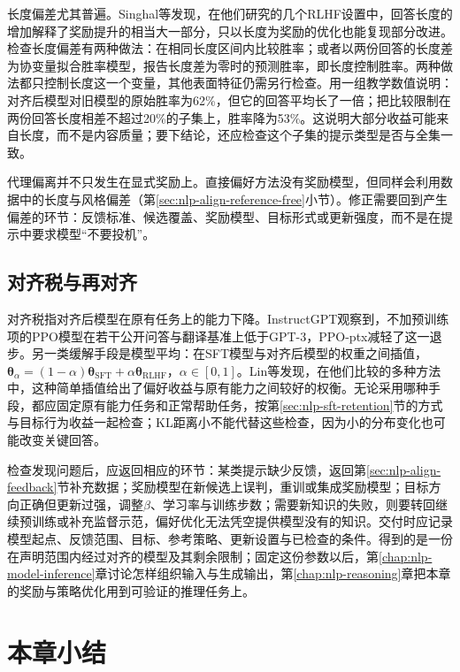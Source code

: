 长度偏差尤其普遍。Singhal等发现，在他们研究的几个RLHF设置中，回答长度的增加解释了奖励提升的相当大一部分，只以长度为奖励的优化也能复现部分改进。检查长度偏差有两种做法：在相同长度区间内比较胜率；或者以两份回答的长度差为协变量拟合胜率模型，报告长度差为零时的预测胜率，即长度控制胜率。两种做法都只控制长度这一个变量，其他表面特征仍需另行检查。用一组教学数值说明：对齐后模型对旧模型的原始胜率为62\%，但它的回答平均长了一倍；把比较限制在两份回答长度相差不超过20\%的子集上，胜率降为53\%。这说明大部分收益可能来自长度，而不是内容质量；要下结论，还应检查这个子集的提示类型是否与全集一致。

代理偏离并不只发生在显式奖励上。直接偏好方法没有奖励模型，但同样会利用数据中的长度与风格偏差（第\ref{sec:nlp-align-reference-free}小节）。修正需要回到产生偏差的环节：反馈标准、候选覆盖、奖励模型、目标形式或更新强度，而不是在提示中要求模型“不要投机”。

\subsection{对齐税与再对齐}
\label{sec:nlp-align-retention}

对齐税指对齐后模型在原有任务上的能力下降。InstructGPT观察到，不加预训练项的PPO模型在若干公开问答与翻译基准上低于GPT-3，PPO-ptx减轻了这一退步。另一类缓解手段是模型平均：在SFT模型与对齐后模型的权重之间插值，$\bm\theta_\alpha=(1-\alpha)\bm\theta_{\mathrm{SFT}}+\alpha\bm\theta_{\mathrm{RLHF}}$，$\alpha\in[0,1]$。Lin等发现，在他们比较的多种方法中，这种简单插值给出了偏好收益与原有能力之间较好的权衡。无论采用哪种手段，都应固定原有能力任务和正常帮助任务，按第\ref{sec:nlp-sft-retention}节的方式与目标行为收益一起检查；KL距离小不能代替这些检查，因为小的分布变化也可能改变关键回答。

检查发现问题后，应返回相应的环节：某类提示缺少反馈，返回第\ref{sec:nlp-align-feedback}节补充数据；奖励模型在新候选上误判，重训或集成奖励模型；目标方向正确但更新过强，调整$\beta$、学习率与训练步数；需要新知识的失败，则要转回继续预训练或补充监督示范，偏好优化无法凭空提供模型没有的知识。交付时应记录模型起点、反馈范围、目标、参考策略、更新设置与已检查的条件。得到的是一份在声明范围内经过对齐的模型及其剩余限制；固定这份参数以后，第\ref{chap:nlp-model-inference}章讨论怎样组织输入与生成输出，第\ref{chap:nlp-reasoning}章把本章的奖励与策略优化用到可验证的推理任务上。

\section{本章小结}
\label{sec:nlp-align-summary}

